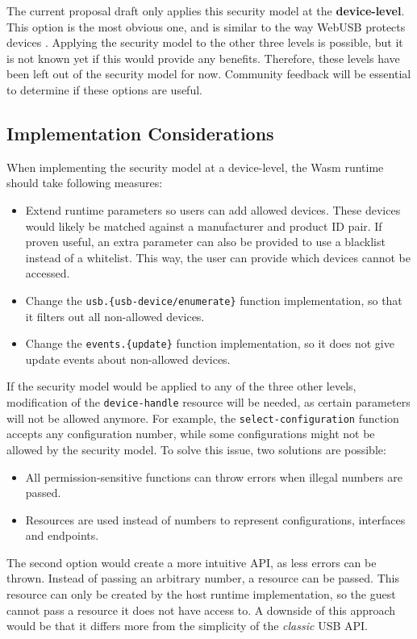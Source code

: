 The current proposal draft only applies this security model at the \textbf{device-level}. This option is the most obvious one, and is similar to the way WebUSB protects devices \cite{webusb_security}. Applying the security model to the other three levels is possible, but it is not known yet if this would provide any benefits. Therefore, these levels have been left out of the security model for now. Community feedback will be essential to determine if these options are useful.

\subsection{Implementation Considerations}
When implementing the security model at a device-level, the \acrshort{Wasm} runtime should take following measures:
\begin{itemize}
\item Extend runtime parameters so users can add allowed devices. These devices would likely be matched against a manufacturer and product ID pair. If proven useful, an extra parameter can also be provided to use a blacklist instead of a whitelist. This way, the user can provide which devices cannot be accessed.
\item Change the \texttt{usb.\{usb-device/enumerate\}} function implementation, so that it filters out all non-allowed devices.
\item Change the \texttt{events.\{update\}} function implementation, so it does not give update events about non-allowed devices.
\end{itemize}

If the security model would be applied to any of the three other levels, modification of the \texttt{device-handle} resource will be needed, as certain parameters will not be allowed anymore. For example, the \texttt{select-configuration} function accepts any configuration number, while some configurations might not be allowed by the security model. To solve this issue, two solutions are possible:

\begin{itemize}
\item All permission-sensitive functions can throw errors when illegal numbers are passed.
\item Resources are used instead of numbers to represent configurations, interfaces and endpoints.
\end{itemize}

The second option would create a more intuitive API, as less errors can be thrown. Instead of passing an arbitrary number, a resource can be passed. This resource can only be created by the host runtime implementation, so the guest cannot pass a resource it does not have access to. A downside of this approach would be that it differs more from the simplicity of the \textit{classic} \acrshort{USB} \acrshort{API}.

